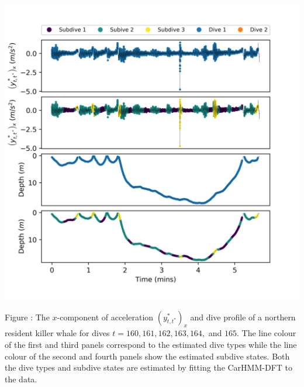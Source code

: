 \documentclass{article}
\begin{document}
        \begin{center}
        \includegraphics[width=6in]{../Plots/CarHMM_decoded_dives.png}
        \end{center}
        
        \noindent Figure : The $x$-component of acceleration $\left(y^*_{t,t^*}\right)_x$ and dive profile of a northern resident killer whale for dives $t = 160,161,162,163,164,$ and $165$. The line colour of the first and third panels correspond to the estimated dive types while the line colour of the second and fourth panels show the estimated subdive states. Both the dive types and subdive states are estimated by fitting the CarHMM-DFT to the data.
        \addtocounter{fignum}{1}
        
\end{document}
